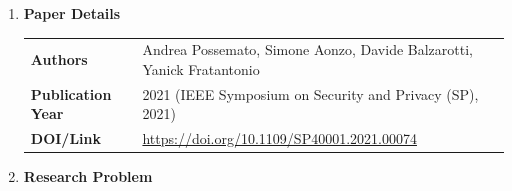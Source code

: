 \documentclass[11pt,a4paper]{article}
\newcommand{\entrypart}[1]{\textbf{\color{accent}#1}\par\vspace{2pt}}
\begin{document}
\begin{enumerate}

    \item \entrypart{Paper Details}

    \begin{tabular}{@{}>{\bfseries}p{3.2cm} p{11.5cm}@{}}
        Authors          & Andrea Possemato, Simone Aonzo, Davide Balzarotti, Yanick Fratantonio \\[2pt]
        Publication Year & 2021 (IEEE Symposium on Security and Privacy (SP), 2021) \\[2pt]
        DOI/Link         & \url{https://doi.org/10.1109/SP40001.2021.00074}
    \end{tabular}

    \item \entrypart{Research Problem}


\end{enumerate}
\end{document}
